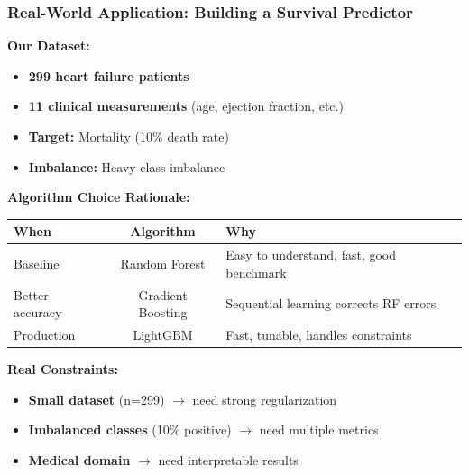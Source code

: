 \documentclass{beamer}
\begin{document}
\begin{frame}[fragile]
\frametitle{Real-World Application: Building a Survival Predictor}

\textbf{Our Dataset:}

\begin{itemize}
    \item \textbf{299 heart failure patients}
    \item \textbf{11 clinical measurements} (age, ejection fraction, etc.)
    \item \textbf{Target:} Mortality (10\% death rate)
    \item \textbf{Imbalance:} Heavy class imbalance
\end{itemize}

\vspace{0.3cm}
\textbf{Algorithm Choice Rationale:}

\begin{center}
{\small
\begin{tabular}{|l|c|l|}
\hline
\textbf{When} & \textbf{Algorithm} & \textbf{Why} \\
\hline
Baseline & Random Forest & Easy to understand, fast, good benchmark \\
\hline
Better accuracy & Gradient Boosting & Sequential learning corrects RF errors \\
\hline
Production & LightGBM & Fast, tunable, handles constraints \\
\hline
\end{tabular}
}
\end{center}

\vspace{0.3cm}
\textbf{Real Constraints:}

\begin{itemize}
    \item \textbf{Small dataset} (n=299) $\rightarrow$ need strong regularization
    \item \textbf{Imbalanced classes} (10\% positive) $\rightarrow$ need multiple metrics
    \item \textbf{Medical domain} $\rightarrow$ need interpretable results
\end{itemize}

\end{frame}
\end{document}
